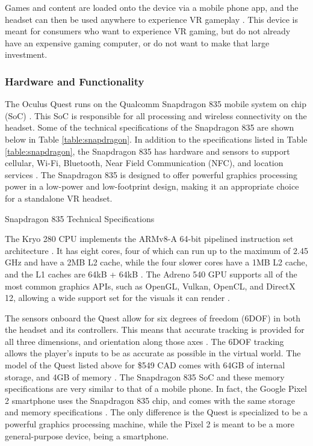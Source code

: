 Games and content are loaded onto the device via a mobile phone app, 
and the headset can then be used anywhere to experience VR gameplay \cite{quest_features}. 
This device is meant for consumers who want to experience VR gaming, 
but do not already have an expensive gaming computer, or do not want 
to make that large investment.

\subsubsection{Hardware and Functionality}
The Oculus Quest runs on the Qualcomm Snapdragon 835 mobile system on chip (SoC) \cite{oculus_dev_page}.
This SoC is responsible for all processing and wireless connectivity on the headset. Some 
of the technical specifications of the Snapdragon 835 are shown
below in Table \ref{table:snapdragon}. In addition to the specifications listed in Table
\ref{table:snapdragon}, the Snapdragon 835 has hardware and sensors to support
cellular, Wi-Fi, Bluetooth, Near Field Communication (NFC), and location services
\cite{snapdragon_835}. The Snapdragon 835 is designed to offer powerful graphics
processing power in a low-power and low-footprint design, making it an appropriate
choice for a standalone VR headset.

\begin{table}[h]
    \centering
    \caption{Snapdragon 835 Technical Specifications}
    \label{table:snapdragon} 
\end{table}

The Kryo 280 CPU implements the ARMv8-A 64-bit pipelined instruction set 
architecture \cite{kryo_arch}. It has eight cores, four of which can run up to
the maximum of 2.45 GHz and have a 2MB L2 cache, while the four slower cores have
a 1MB L2 cache, and the L1 caches are 64kB + 64kB \cite{snapdragon_cache}. The Adreno
540 GPU supports all of the most common graphics APIs, such as OpenGL, Vulkan,
OpenCL, and DirectX 12, allowing a wide support set for the visuals it can render \cite{snapdragon_835}.

The sensors onboard the Quest allow for six degrees of freedom (6DOF) in both the headset
and its controllers. This means that accurate tracking is provided for all three dimensions,
and orientation along those axes \cite{sixdof_defn}. The 6DOF tracking allows the player's
inputs to be as accurate as possible in the virtual world. The model of the Quest 
listed above for \$549 CAD comes with 64GB of internal storage, and 4GB of memory
\cite{quest_timemag}. The Snapdragon 835 SoC and these memory specifications
are very similar to that of a mobile phone. In fact, the Google Pixel 2 smartphone
uses the Snapdragon 835 chip, and comes with the same storage and memory
specifications \cite{quest_polygon}. The only difference is the Quest is
specialized to be a powerful graphics processing machine, while the Pixel 2
is meant to be a more general-purpose device, being a smartphone.

